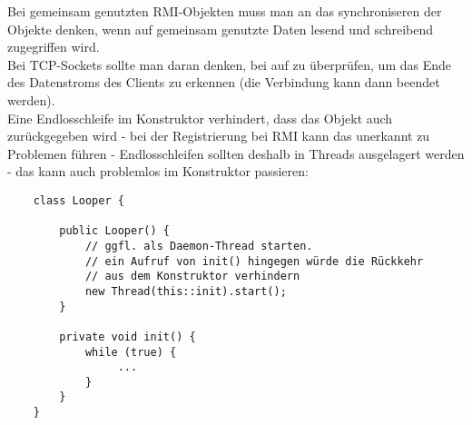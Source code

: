 \noindent
Bei gemeinsam genutzten RMI-Objekten muss man an das synchroniseren der Objekte denken, wenn auf gemeinsam genutzte
Daten lesend und schreibend zugegriffen wird.\\

\noindent
Bei TCP-Sockets sollte man daran denken, bei  auf  zu überprüfen, um das Ende des Datenstroms des Clients zu erkennen (die Verbindung kann dann beendet werden).\\

\noindent
Eine Endlosschleife im Konstruktor verhindert, dass das Objekt auch zurückgegeben wird - bei der Registrierung bei RMI kann das unerkannt zu Problemen führen - Endlosschleifen sollten deshalb in Threads ausgelagert werden - das kann auch problemlos im Konstruktor passieren:

\begin{verbatim}
    class Looper {

        public Looper() {
            // ggfl. als Daemon-Thread starten.
            // ein Aufruf von init() hingegen würde die Rückkehr
            // aus dem Konstruktor verhindern
            new Thread(this::init).start();
        }

        private void init() {
            while (true) {
                 ...
            }
        }
    }
\end{verbatim}